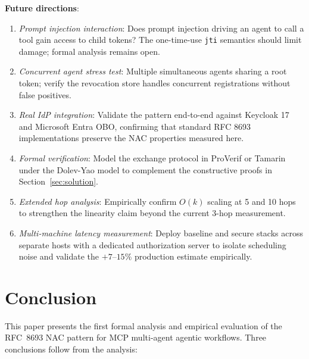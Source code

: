 \documentclass[journal]{IEEEtran}
\begin{document}
\textbf{Future directions}:
\begin{enumerate}
  \item \textit{Prompt injection interaction}: Does prompt injection driving an
        agent to call a tool gain access to child tokens? The one-time-use
        \texttt{jti} semantics should limit damage; formal analysis remains open.
  \item \textit{Concurrent agent stress test}: Multiple simultaneous agents
        sharing a root token; verify the revocation store handles concurrent
        registrations without false positives.
  \item \textit{Real IdP integration}: Validate the pattern end-to-end against
        Keycloak 17 and Microsoft Entra OBO, confirming that standard RFC 8693
        implementations preserve the NAC properties measured here.
  \item \textit{Formal verification}: Model the exchange protocol in ProVerif
        \cite{blanchet2001} or Tamarin \cite{meier2013} under the Dolev-Yao
        model to complement the constructive proofs in
        Section~\ref{sec:solution}.
  \item \textit{Extended hop analysis}: Empirically confirm $O(k)$ scaling at
        5 and 10 hops to strengthen the linearity claim beyond the current
        3-hop measurement.
  \item \textit{Multi-machine latency measurement}: Deploy baseline and secure
        stacks across separate hosts with a dedicated authorization server to
        isolate scheduling noise and validate the $+7$--$15\%$ production
        estimate empirically.
\end{enumerate}


\FloatBarrier  %

\section{Conclusion}
\label{sec:conclusion}

This paper presents the first formal analysis and empirical evaluation of the
RFC~8693 NAC pattern for MCP multi-agent agentic workflows. Three conclusions
follow from the analysis:
\end{document}
